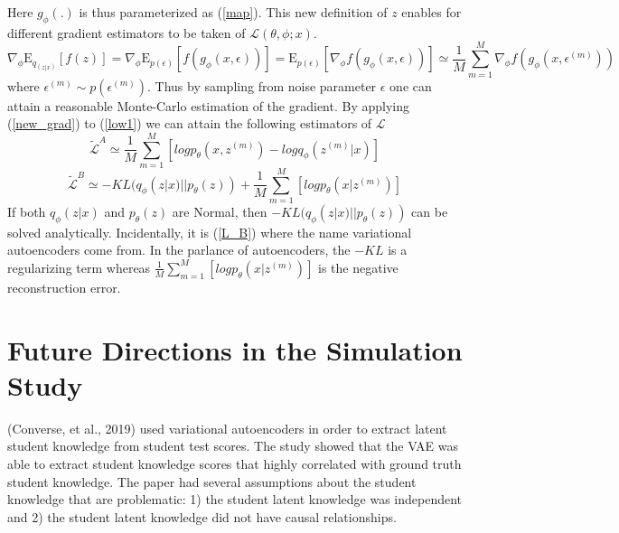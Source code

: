 \documentclass[10pt]{article}
\begin{document}
Here $g_{\phi}(.)$ is thus parameterized as (\ref{map}).  This new definition of $z$ enables for 
different gradient estimators to be taken of $\mathcal{L}(\theta, \phi; x)$.
%
\begin{equation}\label{new_grad}
\nabla_{\phi}\mathrm{E}_{q_(z|x)}[f(z)] = \nabla_{\phi}\mathrm{E}_{p(\epsilon)}[f(g_{\phi}(x,\epsilon))]
= \mathrm{E}_{p(\epsilon)}[\nabla_{\phi}f(g_{\phi}(x,\epsilon))] 
\simeq \frac{1}{M}\sum_{m=1}^{M}\nabla_{\phi}f(g_{\phi}(x,\epsilon^{(m)}))
\end{equation}
where $\epsilon^{(m)} \sim p(\epsilon^{(m)})$.  Thus by sampling from noise parameter $\epsilon$
one can attain a reasonable Monte-Carlo estimation of the gradient.  By applying (\ref{new_grad})
to (\ref{low1}) we can attain the following estimators of $\mathcal{L}$
%
\begin{equation} \label{L_A}
\tilde{\mathcal{L}}^A \simeq \frac{1}{M}\sum_{m=1}^{M}[logp_{\theta}(x,z^{(m)}) - logq_{\phi}(z^{(m)}|x)]
\end{equation}
\begin{equation} \label{L_B}
\tilde{\mathcal{L}}^B \simeq -KL(q_{\phi}(z|x)||p_{\theta}(z)) +
\frac{1}{M}\sum_{m=1}^{M}[logp_{\theta}(x|z^{(m)})]
\end{equation}
%
%
If both $q_{\phi}(z|x)$ and $p_{\theta}(z)$ are Normal, then $-KL(q_{\phi}(z|x)||p_{\theta}(z))$ 
can be solved analytically. Incidentally, it is (\ref{L_B}) where the name variational
autoencoders come from.  In the parlance of autoencoders, the $-KL$ is a regularizing
term whereas $\frac{1}{M}\sum_{m=1}^{M}[logp_{\theta}(x|z^{(m)})]$ is the negative
reconstruction error.


\section{Future Directions in the Simulation Study}
(Converse, et al., 2019) used variational autoencoders in order to extract latent student knowledge from student test scores.  The study showed that the VAE was able to extract student knowledge scores that highly correlated with ground truth student knowledge.  The paper had several assumptions about the student knowledge that are problematic:
1) the student latent knowledge was independent and 
2) the student latent knowledge did not have causal relationships.
\end{document}
